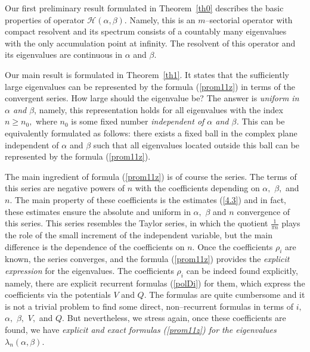 \documentclass[10pt, a4paper]{article}
\theoremstyle{plain}
\theoremstyle{definition}
\numberwithin{equation}{section}
\def\l{\lambda}
\def\a{\alpha}
\def\b{\beta}
\begin{document}
Our first preliminary result formulated in Theorem~\ref{th0} describes the basic properties of operator $\mathcal{H}(\alpha, \beta)$. Namely, this is an $m$--sectorial operator with compact resolvent and its spectrum consists of a countably many eigenvalues with the only accumulation point at infinity. The resolvent of this operator and its eigenvalues are continuous in $\a$ and $\b.$

Our main result is formulated in Theorem~\ref{th1}. It states that the sufficiently large eigenvalues can be represented by the formula (\ref{prom11z}) in terms of the convergent series. How large should the eigenvalue be? The answer is \textit{uniform  in $\a$ and $\b$}, namely, this representation holds for all eigenvalues with the index $n\geqslant n_0,$ where $n_0$ is some fixed number \textit{independent of $\a$ and $\b$.} This can be equivalently formulated as follows: there exists a fixed ball in the complex plane independent of $\a$ and $\b$ such that all eigenvalues located outside this ball can be represented by the formula (\ref{prom11z}).

The main ingredient of formula (\ref{prom11z}) is of course the series. The  terms of this series are negative powers of $n$ with the coefficients depending on $\a,$ $\b,$ and $n.$ The main property of these coefficients is 
the estimates (\ref{4.3}) and in fact, these estimates ensure the absolute and uniform in $\a,$ $\b$ and $n$ convergence of this series. This series resembles the Taylor series, in which the quotient $\frac{1}{\pi n}$ plays the role of the small increment of the independent variable, but the main difference is the dependence of the coefficients on $n.$  Once the coefficients $\rho_i$ are known, the series converges, and the formula (\ref{prom11z}) provides the \textit{explicit expression} for the eigenvalues. The coefficients $\rho_i$ can be indeed found explicitly, namely, there are explicit recurrent formulas (\ref{polDi}) for them, which express the coefficients via the potentials $V$ and $Q.$ The formulas are  quite cumbersome and it is not a trivial problem to find some direct, non--recurrent formulas in terms of $i,$ $\a,$ $\b,$ $V,$ and $Q.$ But nevertheless, we stress again, once these coefficients are found, we have \textit{explicit and exact formulas (\ref{prom11z}) for the eigenvalues} $\l_n(\a,\b).$
\end{document}
